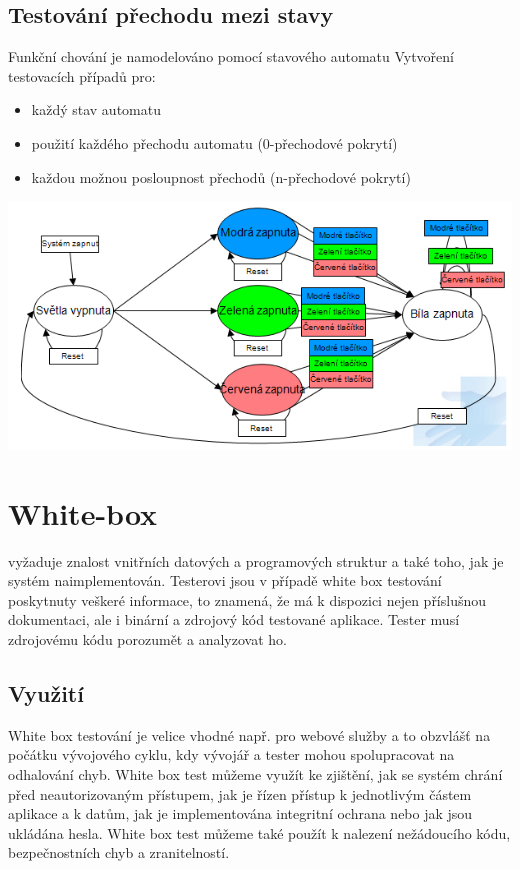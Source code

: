 \documentclass{article}
\begin{document}
\begin{large}
\subsection{Testování přechodu mezi stavy}
Funkční chování je namodelováno pomocí stavového automatu\newline
Vytvoření testovacích případů pro:
\begin{itemize}
    \item každý stav automatu
    \item použití každého přechodu automatu (0-přechodové pokrytí)
    \item každou možnou posloupnost přechodů (n-přechodové pokrytí)
\end{itemize}
\includegraphics{test}   
\section{White-box}
vyžaduje znalost vnitřních datových a programových struktur a také toho, jak je systém naimplementován. Testerovi jsou v případě white box testování poskytnuty veškeré informace, to znamená, že má k dispozici nejen příslušnou dokumentaci, ale i binární a zdrojový kód testované aplikace. Tester musí zdrojovému kódu porozumět a analyzovat ho.
\subsection{Využití}
White box testování je velice vhodné např. pro webové služby a to obzvlášť na počátku vývojového cyklu, kdy vývojář a tester mohou spolupracovat na odhalování chyb. White box test můžeme využít ke zjištění, jak se systém chrání před neautorizovaným přístupem, jak je řízen přístup k jednotlivým částem aplikace a k datům, jak je implementována integritní ochrana nebo jak jsou ukládána hesla. White box test můžeme také použít k nalezení nežádoucího kódu, bezpečnostních chyb a zranitelností.

\end{large}
\end{document}

